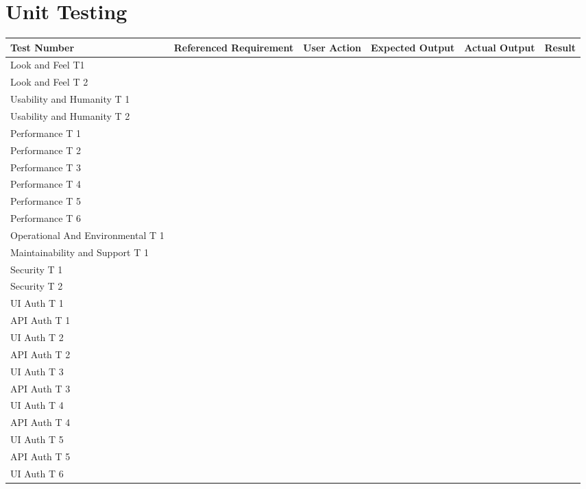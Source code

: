 \documentclass[12pt, titlepage]{article}
\begin{document}
\section{Unit Testing}

\begin{tabularx}{\textwidth}{|K|K|K|K|K|K|}
	\hline 
	Test Number & Referenced Requirement & User Action & Expected Output & Actual Output & Result \\
	\hline 
	Look and Feel T1 &  &  &  &  &  \\
	\hline 
	Look and Feel T 2 &  &  &  &  &  \\
	\hline 
	Usability and Humanity T 1 &  &  &  &  &  \\
	\hline 
	Usability and Humanity T 2 &  &  &  &  &  \\
	\hline 
	Performance T 1 &  &  &  &  &  \\
	\hline 
	Performance T 2 &  &  &  &  &  \\
	\hline 
	Performance T 3 &  &  &  &  &  \\
	\hline 
	Performance T 4 &  &  &  &  &  \\
	\hline 
	Performance T 5 &  &  &  &  &  \\
	\hline 
	Performance T 6 &  &  &  &  &  \\
	\hline 
	Operational And Environmental T 1 &  &  &  &  &  \\
	\hline 
	Maintainability and Support T 1 &  &  &  &  &  \\
	\hline 
	Security T 1 &  &  &  &  &  \\
	\hline 
	Security T 2 &  &  &  &  &  \\
	\hline 
	UI Auth T 1 &  &  &  &  &  \\
	\hline 
	API Auth T 1 &  &  &  &  &  \\
	\hline 
	UI Auth T 2 &  &  &  &  &  \\
	\hline 
	API Auth T 2 &  &  &  &  &  \\
	\hline 
	UI Auth T 3 &  &  &  &  &  \\
	\hline 
	API Auth T 3 &  &  &  &  &  \\
	\hline 
	UI Auth T 4 &  &  &  &  &  \\
	\hline 
	API Auth T 4 &  &  &  &  &  \\
	\hline 
	UI Auth T 5 &  &  &  &  &  \\
	\hline 
	API Auth T 5 &  &  &  &  &  \\
	\hline 
	UI Auth T 6 &  &  &  &  &  \\

\end{tabularx}
\end{document}
